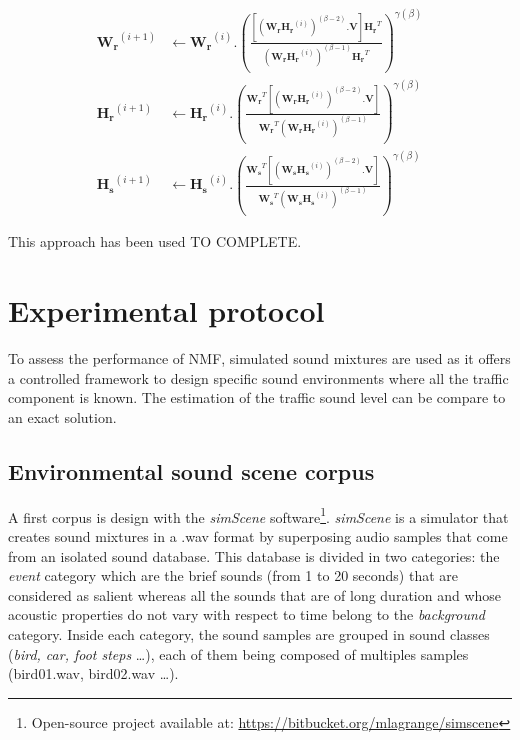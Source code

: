 \documentclass[twocolumn,a4paper,10pt]{article}
\begin{document}
{\scriptsize
\begin{subequations}\label{eq:WH-SSupdate}
\begin{align}
\mathbf{W_r}^{(i+1)} &\leftarrow \mathbf{W_r}^{(i)}.\left(\frac{\left[\left(\mathbf{W_r H_r}^{(i)} \right)^{(\beta-2)}.\mathbf{V} \right]\mathbf{H_r}^T}{\left(\mathbf{W_r H_r}^{(i)} \right)^{(\beta-1)}\mathbf{H_r}^T}\right)^{\gamma(\beta)}\label{eq:W_r_SS}\\
\mathbf{H_r}^{(i+1)} &\leftarrow \mathbf{H_r}^{(i)}.\left(\frac{\mathbf{W_r}^T \left[\left(\mathbf{W_r H_r}^{(i)} \right)^{(\beta-2)}.\mathbf{V} \right]}{\mathbf{W_r}^T \left(\mathbf{W_r H_r}^{(i)} \right)^{(\beta-1)}}\right)^{\gamma(\beta)}\label{eq:H_r_SS}\\
\mathbf{H_s}^{(i+1)} &\leftarrow \mathbf{H_s}^{(i)}.\left(\frac{\mathbf{W_s}^T \left[\left(\mathbf{W_s H_s}^{(i)} \right)^{(\beta-2)}.\mathbf{V} \right]}{\mathbf{W_s}^T \left(\mathbf{W_s H_s}^{(i)} \right)^{(\beta-1)}}\right)^{\gamma(\beta)}\label{eq:H_s_SS}
\end{align}
\end{subequations}}

This approach has been used TO COMPLETE.

\section{Experimental protocol}\label{part:protocol}

To assess the performance of NMF, simulated sound mixtures are used as it offers a controlled framework to design specific sound environments where all the traffic component is known. The estimation of the traffic sound level can be compare to an exact solution. 

\subsection{Environmental sound scene corpus}

A first corpus is design with the \textit{simScene} software\footnote{Open-source project available at: \url{https://bitbucket.org/mlagrange/simscene}}. \textit{simScene} \cite{rossignol_simscene:_2015} is a simulator that creates sound mixtures in a .wav format by superposing audio samples that come from an isolated sound database. This database is divided in two categories: the \textit{event} category which are the brief sounds (from 1 to 20 seconds) that are considered as salient whereas all the sounds that are of long duration and whose acoustic properties do not vary with respect to time belong to the \textit{background} category. Inside each category, the sound samples are grouped in sound classes (\textit{bird, car, foot steps} \dots), each of them being composed of multiples samples (bird01.wav, bird02.wav \dots).
\end{document}

